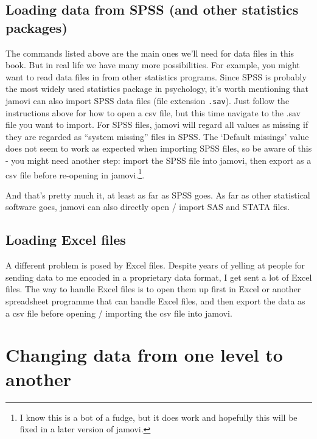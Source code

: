 \documentclass[
]{book}
\begin{document}
\hypertarget{loading-data-from-spss-and-other-statistics-packages}{%
\subsection{Loading data from SPSS (and other statistics packages)}\label{loading-data-from-spss-and-other-statistics-packages}}

The commands listed above are the main ones we'll need for data files in this book. But in real life we have many more possibilities. For example, you might want to read data files in from other statistics programs. Since SPSS is probably the most widely used statistics package in psychology, it's worth mentioning that jamovi can also import SPSS data files (file extension \texttt{.sav}). Just follow the instructions above for how to open a csv file, but this time navigate to the .sav file you want to import. For SPSS files, jamovi will regard all values as missing if they are regarded as ``system missing'' files in SPSS. The `Default missings' value does not seem to work as expected when importing SPSS files, so be aware of this - you might need another step: import the SPSS file into jamovi, then export as a csv file before re-opening in jamovi.\footnote{I know this is a bot of a fudge, but it does work and hopefully this will be fixed in a later version of jamovi.}.

And that's pretty much it, at least as far as SPSS goes. As far as other statistical software goes, jamovi can also directly open / import SAS and STATA files.

\hypertarget{loading-excel-files}{%
\subsection{Loading Excel files}\label{loading-excel-files}}

A different problem is posed by Excel files. Despite years of yelling at people for sending data to me encoded in a proprietary data format, I get sent a lot of Excel files. The way to handle Excel files is to open them up first in Excel or another spreadsheet programme that can handle Excel files, and then export the data as a csv file before opening / importing the csv file into jamovi.

\hypertarget{coercion}{%
\section{Changing data from one level to another}\label{coercion}}
\end{document}
